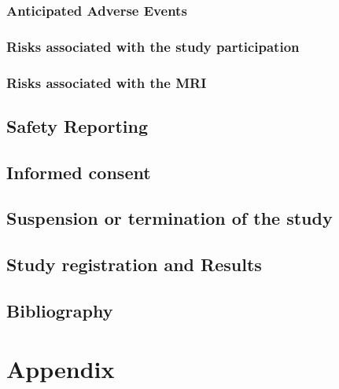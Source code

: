 \documentclass[
	a4paper, 
	11.5pt,
	headings=small, 
	twoside, 
	titlepage=firstiscover, 
 	pagesize=auto,
  	version=last,
	open=any,
	BCOR=14mm,
  	chapterprefix=false]{scrbook}
\begin{document}
\subsection{Anticipated Adverse Events}

\subsection{Risks associated with the study participation}

\subsection{Risks associated with the \ac{MRI}}

\section{Safety Reporting}

\section{Informed consent}

\section{Suspension or termination of the study}

\section{Study registration and Results}

\section{Bibliography}

\chapter{Appendix}
\end{document}
